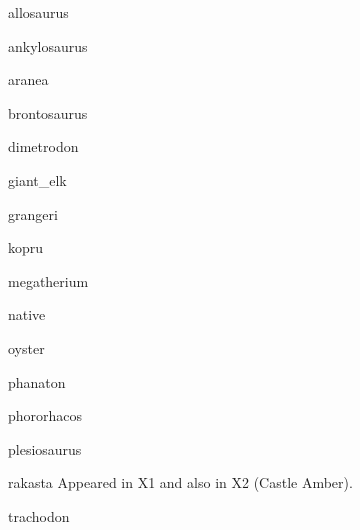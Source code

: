 \documentclass[a4paper,serif]{module}
\begin{document}
\begin{newmonster}{allosaurus}\end{newmonster}
\begin{newmonster}{ankylosaurus}\end{newmonster}
\begin{newmonster}{aranea}\end{newmonster}
\begin{newmonster}{brontosaurus}\end{newmonster}
\begin{newmonster}{dimetrodon}\end{newmonster}
\begin{newmonster}{giant_elk}\end{newmonster}
\begin{newmonster}{grangeri}\end{newmonster}
\begin{newmonster}{kopru}\end{newmonster}
\begin{newmonster}{megatherium}\end{newmonster}
\begin{newmonster}{native}\end{newmonster}
\begin{newmonster}{oyster}\end{newmonster}
\begin{newmonster}{phanaton}\end{newmonster}
\begin{newmonster}{phororhacos}\end{newmonster}
\begin{newmonster}{plesiosaurus}\end{newmonster}
\begin{newmonster}{rakasta}
Appeared in X1 and also in X2 (Castle Amber).
\end{newmonster}
\begin{newmonster}{trachodon}\end{newmonster}
\end{document}
